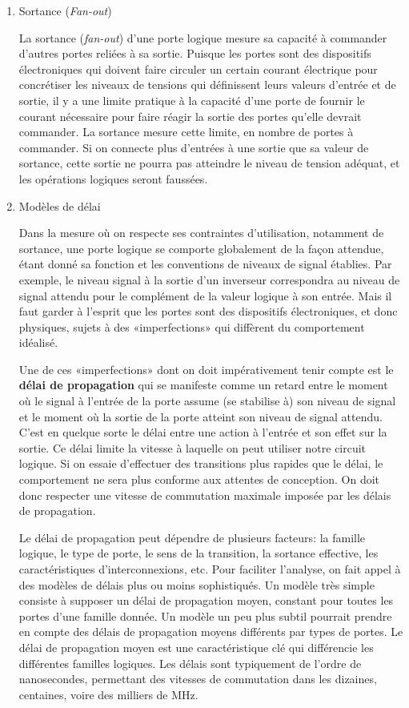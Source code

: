 \documentclass[letter, oneside]{book}
\begin{document}
\begin{enumerate}
\item Sortance (\emph{Fan-out})
\label{sec:orgc04c49d}

La sortance (\emph{fan-out}) d'une porte logique mesure sa capacité à commander
d'autres portes reliées à sa sortie. Puisque les portes sont des
dispositifs électroniques qui doivent faire circuler un certain
courant électrique pour concrétiser les niveaux de tensions qui
définissent leurs valeurs d'entrée et de sortie, il y a une limite
pratique à la capacité d'une porte de fournir le courant nécessaire
pour faire réagir la sortie des portes qu'elle devrait commander. La sortance 
mesure cette limite, en nombre de portes à commander. Si on
connecte plus d'entrées à une sortie que sa valeur de sortance, cette
sortie ne pourra pas atteindre le niveau de tension adéquat, et les
opérations logiques seront faussées.

\item Modèles de délai
\label{sec:org5f07caa}

Dans la mesure où on respecte ses contraintes d'utilisation, notamment
de sortance, une porte logique se comporte globalement de la façon
attendue, étant donné sa fonction et les conventions de niveaux de
signal établies. Par exemple, le niveau signal à la sortie d'un
inverseur correspondra au niveau de signal attendu pour le complément
de la valeur logique à son entrée. Mais il faut garder à l'esprit que
les portes sont des dispositifs électroniques, et donc physiques,
sujets à des «imperfections» qui diffèrent du comportement idéalisé.

Une de ces «imperfections» dont on doit impérativement tenir compte
est le \textbf{délai de propagation} qui se manifeste comme un retard entre
le moment où le signal à l'entrée de la porte assume (se stabilise à)
son niveau de signal et le moment où la sortie de la porte atteint
son niveau de signal attendu. C'est en quelque sorte le délai entre
une action à l'entrée et son effet sur la sortie. Ce délai limite la
vitesse à laquelle on peut utiliser notre circuit logique. Si on
essaie d'effectuer des transitions plus rapides que le délai, le
comportement ne sera plus conforme aux attentes de conception. On doit
donc respecter une vitesse de commutation maximale imposée par les
délais de propagation.

Le délai de propagation peut dépendre de plusieurs facteurs: la
famille logique, le type de porte, le sens de la transition, la
sortance effective, les caractéristiques d'interconnexions, etc. Pour
faciliter l'analyse, on fait appel à des modèles de délais plus ou
moins sophistiqués. Un modèle très simple consiste à supposer un délai
de propagation moyen, constant pour toutes les portes d'une famille
donnée. Un modèle un peu plus subtil pourrait prendre en compte des
délais de propagation moyens différents par types de portes. Le délai
de propagation moyen est une caractéristique clé qui différencie les
différentes familles logiques. Les délais sont typiquement de l'ordre
de nanosecondes, permettant des vitesses de commutation dans les
dizaines, centaines, voire des milliers de MHz.


\end{enumerate}
\end{document}
